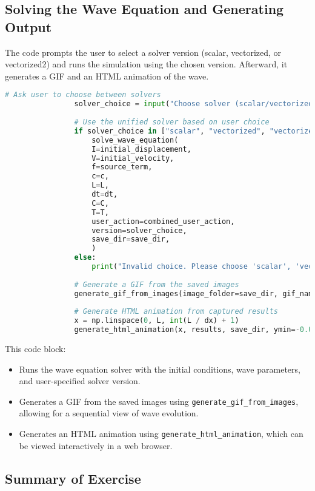 \documentclass{article}
\begin{document}
			\subsection{Solving the Wave Equation and Generating Output}
			
			The code prompts the user to select a solver version (scalar, vectorized, or vectorized2) and runs the simulation using the chosen version. Afterward, it generates a GIF and an HTML animation of the wave.
			
			\begin{lstlisting}[language=Python]
				# Ask user to choose between solvers
				solver_choice = input("Choose solver (scalar/vectorized/vectorized2): ").strip()
				
				# Use the unified solver based on user choice
				if solver_choice in ["scalar", "vectorized", "vectorized2"]:
					solve_wave_equation(
					I=initial_displacement,
					V=initial_velocity,
					f=source_term,
					c=c,
					L=L,
					dt=dt,
					C=C,
					T=T,
					user_action=combined_user_action,
					version=solver_choice,
					save_dir=save_dir,
					)
				else:
					print("Invalid choice. Please choose 'scalar', 'vectorized', or 'vectorized2'.")
				
				# Generate a GIF from the saved images
				generate_gif_from_images(image_folder=save_dir, gif_name='wave_animation.gif', duration=0.1)
				
				# Generate HTML animation from captured results
				x = np.linspace(0, L, int(L / dx) + 1)
				generate_html_animation(x, results, save_dir, ymin=-0.005, ymax=0.005, fps=10)
			\end{lstlisting}
			
			This code block:
			\begin{itemize}
				\item Runs the wave equation solver with the initial conditions, wave parameters, and user-specified solver version.
				\item Generates a GIF from the saved images using \texttt{generate\_gif\_from\_images}, allowing for a sequential view of wave evolution.
				\item Generates an HTML animation using \texttt{generate\_html\_animation}, which can be viewed interactively in a web browser.
			\end{itemize}
			
			\subsection{Summary of Exercise}
			
\end{document}

